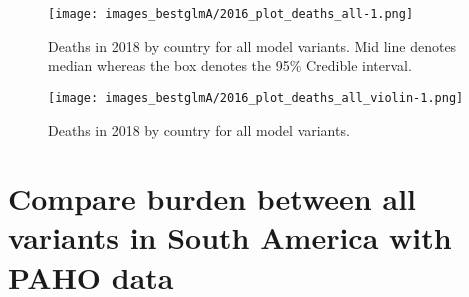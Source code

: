 \documentclass[
]{article}
\newenvironment{Shaded}{\begin{snugshade}}{\end{snugshade}}
\newcommand{\DataTypeTok}[1]{\textcolor[rgb]{0.13,0.29,0.53}{#1}}
\newcommand{\DecValTok}[1]{\textcolor[rgb]{0.00,0.00,0.81}{#1}}
\newcommand{\KeywordTok}[1]{\textcolor[rgb]{0.13,0.29,0.53}{\textbf{#1}}}
\newcommand{\NormalTok}[1]{#1}
\newcommand{\OperatorTok}[1]{\textcolor[rgb]{0.81,0.36,0.00}{\textbf{#1}}}
\newcommand{\StringTok}[1]{\textcolor[rgb]{0.31,0.60,0.02}{#1}}
\begin{document}
\begin{figure}
\centering
\texttt{[image: images\_bestglmA/2016\_plot\_deaths\_all-1.png]}
\caption{Deaths in 2018 by country for all model variants. Mid line
denotes median whereas the box denotes the 95\% Credible interval.}
\end{figure}

\begin{Shaded}
\end{Shaded}

\begin{figure}
\centering
\texttt{[image: images\_bestglmA/2016\_plot\_deaths\_all\_violin-1.png]}
\caption{Deaths in 2018 by country for all model variants.}
\end{figure}

\hypertarget{compare-burden-between-all-variants-in-south-america-with-paho-data}{%
\section{Compare burden between all variants in South America with PAHO
data}\label{compare-burden-between-all-variants-in-south-america-with-paho-data}}
\end{document}

